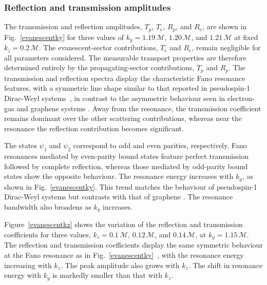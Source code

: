 \documentclass[aps,prb,onecolumn,longbibliography,nofootinbib,citeautoscript,10pt]{revtex4-2}
\begin{document}
\subsubsection{Reflection and transmission amplitudes}

The transmission and reflection amplitudes, $T_p$, $T_e$, $R_p$, and $R_e$, are shown in Fig.~\ref{evanescentky} for three values of $k_y=1.19\,\mathcal{M}$, $1.20\,\mathcal{M}$, and $1.21\,\mathcal{M}$ at fixed $k_z=0.2\,\mathcal{M}$. The evanescent-sector contributions, $T_e$ and $R_e$, remain negligible for all parameters considered. The measurable transport properties are therefore determined entirely by the propagating-sector contributions, $T_p$ and $R_p$. The transmission and reflection spectra display the characteristic Fano resonance features, with a symmetric line shape similar to that reported in pseudospin-1 Dirac-Weyl systems \cite{Zhu17} \,,  in contrast to the asymmetric behaviour seen in electron-gas and graphene systems \cite{reichl199, Zhu15}. Away from the resonance, the transmission coefficient remains dominant over the other scattering contributions, whereas near the resonance the reflection contribution becomes significant.

The states $\psi_{1}$ and $\psi_2$ correspond to odd and even parities, respectively. Fano resonances mediated by even-parity bound states feature perfect transmission followed by complete reflection, whereas those mediated by odd-parity bound states show the opposite behaviour. The resonance energy increases with $k_y$, as shown in Fig.~\ref{evanescentky}. This trend matches the behaviour of pseudospin-1 Dirac-Weyl systems \cite{Zhu17} but contrasts with that of graphene \cite{reichl199, Zhu15}. The resonance bandwidth also broadens as $k_y$ increases.

Figure~\ref{evanescentkz} shows the variation of the reflection and transmission coefficients for three values, $k_z = 0.1\,\mathcal{M}$, $0.12\,\mathcal{M}$, and $0.14\,\mathcal{M}$, at $k_y = 1.15\,\mathcal{M}$. The reflection and transmission coefficients display the same symmetric behaviour at the Fano resonance as in Fig.~\ref{evanescentky} \,,  with the resonance energy increasing with $k_z$. The peak amplitude also grows with $k_z$. The shift in resonance energy with $k_y$ is markedly smaller than that with $k_z$.
\end{document}
